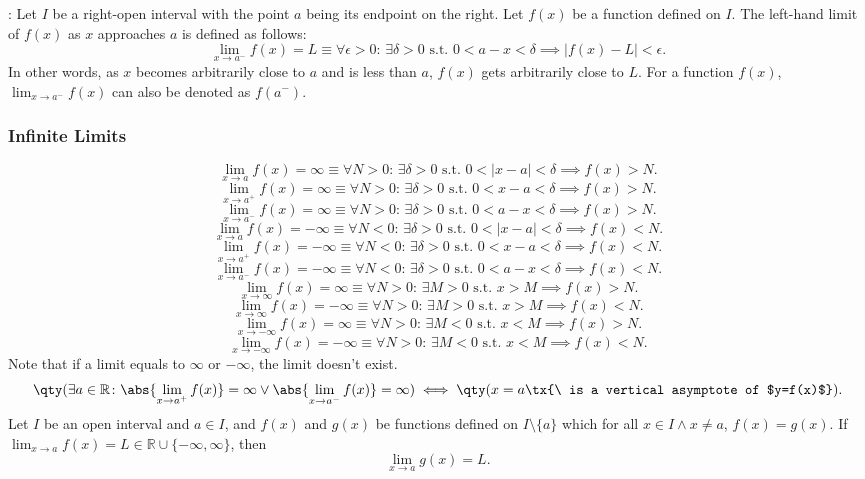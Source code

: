 \documentclass[a4paper,12pt]{report}
\begin{document}
: Let \(I\) be a right-open interval with the point \(a\) being its endpoint on the right. Let \( f(x) \) be a function defined on \(I\). The left-hand limit of \( f(x) \) as \( x \) approaches \( a \) is defined as follows:
\[\lim_{x \to a^-} f(x) = L \equiv \forall \epsilon > 0 :\,\exists \delta > 0 \text{\ s.t.\ } 0 < a - x < \delta \implies |f(x) - L| < \epsilon.\]
In other words, as \(x\) becomes arbitrarily close to \(a\) and is less than \(a\), \(f(x)\) gets arbitrarily close to \(L\). For a function $f(x)$, $\lim_{x\to a^-}f(x)$ can also be denoted as $f(a^-)$.
\subsubsection{Infinite Limits}
\[\lim_{x\to a}f(x)=\infty \equiv \forall N > 0:\, \exists \delta > 0 \text{\ s.t.\ } 0 < |x - a| < \delta \implies f(x) > N.\]
\[\lim_{x\to a^+}f(x)=\infty \equiv \forall N > 0:\, \exists \delta > 0 \text{\ s.t.\ } 0 < x - a < \delta \implies f(x) > N.\]
\[\lim_{x\to a^-}f(x)=\infty \equiv \forall N > 0:\, \exists \delta > 0 \text{\ s.t.\ } 0 < a - x < \delta \implies f(x) > N.\]
\[\lim_{x\to a}f(x)=-\infty \equiv \forall N < 0:\, \exists \delta > 0 \text{\ s.t.\ } 0 < |x - a| < \delta \implies f(x) < N.\]
\[\lim_{x\to a^+}f(x)=-\infty \equiv \forall N < 0:\, \exists \delta > 0 \text{\ s.t.\ } 0 < x - a < \delta \implies f(x) < N.\]
\[\lim_{x\to a^-}f(x)=-\infty \equiv \forall N < 0:\, \exists \delta > 0 \text{\ s.t.\ } 0 < a - x < \delta \implies f(x) < N.\]
\[\lim_{x\to\infty}f(x)=\infty \equiv \forall N > 0:\, \exists M > 0 \text{\ s.t.\ } x > M \implies f(x) > N.\]
\[\lim_{x\to\infty}f(x)=-\infty \equiv \forall N > 0:\, \exists M > 0 \text{\ s.t.\ } x > M \implies f(x) < N.\]
\[\lim_{x\to-\infty}f(x)=\infty \equiv \forall N > 0:\, \exists M < 0 \text{\ s.t.\ } x < M \implies f(x) > N.\]
\[\lim_{x\to-\infty}f(x)=-\infty \equiv \forall N > 0:\, \exists M < 0 \text{\ s.t.\ } x < M \implies f(x) < N.\]
Note that if a limit equals to $\infty$ or $-\infty$, the limit doesn't exist.
\[\qty(\exists a\in\mathbb{R}\colon\abs{\lim_{x \to a^+} f(x)}=\infty\lor\abs{\lim_{x \to a^-} f(x)}=\infty)\iff \qty(x=a\tx{\ is a vertical asymptote of $y=f(x)$}).\]
Let $I$ be an open interval and $a\in I$, and $f(x)$ and $g(x)$ be functions defined on $I\setminus\{a\}$ which for all $x\in I\land x\neq a$, $f(x)=g(x)$. If $\lim_{x\to a}f(x)=L\in\mathbb{R}\cup\{-\infty,\infty\}$, then
\[\lim_{x\to a}g(x)=L.\]
\end{document}
